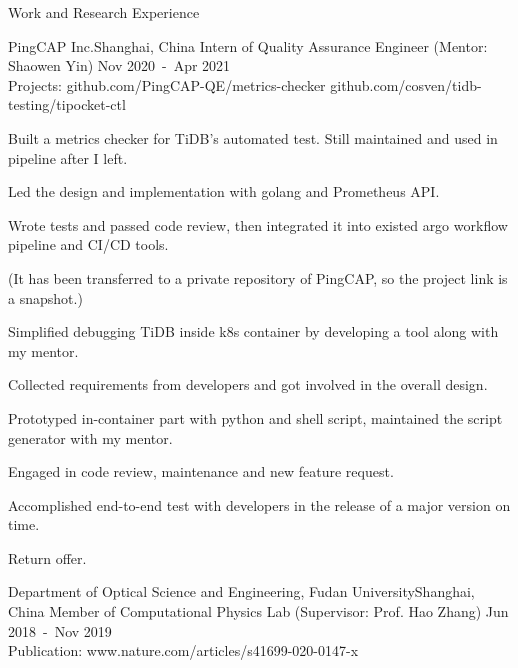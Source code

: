 \documentclass{resume} %
\begin{document}
\begin{rSection}{Work and Research Experience}
\begin{rSubsection}
\end{rSubsection}



\begin{rSubsection}
{PingCAP Inc.}{Shanghai, China}
{Intern of Quality Assurance Engineer (Mentor: Shaowen Yin)} {Nov 2020\ -\ Apr 2021
\\  Projects: github.com/PingCAP-QE/metrics-checker github.com/cosven/tidb-testing/tipocket-ctl
}

\item Built a metrics checker for TiDB's automated test. Still maintained and used in pipeline after I left.

\begin{mySecondItemize}
    \item Led the design and implementation with golang and Prometheus API.
    \item Wrote tests and passed code review, then integrated it into existed argo workflow pipeline and CI/CD tools.
    \item (It has been transferred to a private repository of PingCAP, so the project link is a snapshot.)
\end{mySecondItemize}

\item Simplified debugging TiDB inside k8s container by developing a tool along with my mentor.
\begin{mySecondItemize}
    \item Collected requirements from developers and got involved in the overall design.
    \item Prototyped in-container part with python and shell script, maintained the script generator with my mentor.
    \item Engaged in code review, maintenance and new feature request.
\end{mySecondItemize}
\item Accomplished end-to-end test with developers in the release of a major version on time.
\item Return offer.



\end{rSubsection}



\begin{rSubsection}
{Department of Optical Science and Engineering, Fudan University}{Shanghai, China}
{Member of Computational Physics Lab (Supervisor: Prof. Hao Zhang)}
{Jun 2018\ -\ Nov 2019
\\ Publication: www.nature.com/articles/s41699-020-0147-x }


\end{rSubsection}
\end{rSection}
\end{document}
